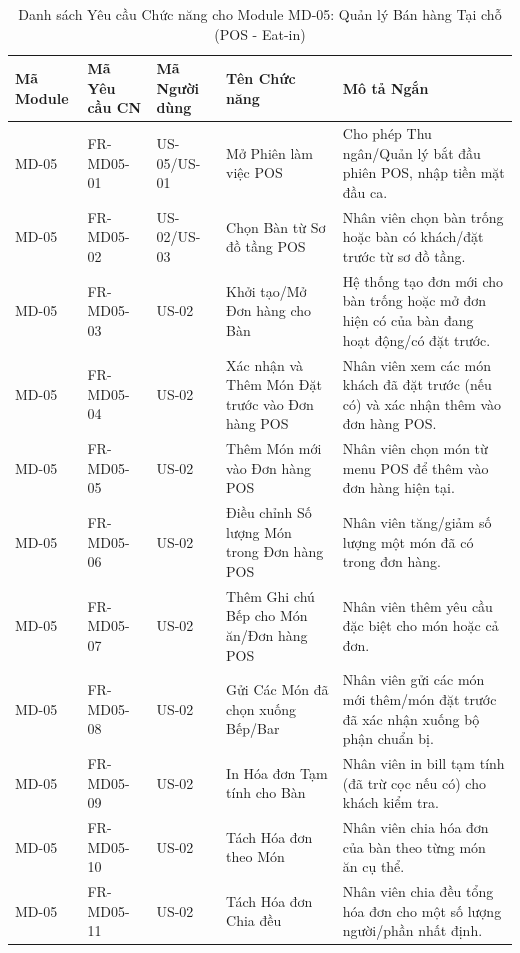\begin{longtable}{|m{2cm}|m{2.5cm}|m{2cm}|m{4.5cm}|m{4cm}|}
\caption{Danh sách Yêu cầu Chức năng cho Module MD-05: Quản lý Bán hàng Tại chỗ (POS - Eat-in)} \label{tab:fr_md05_revised_v3_no_card} \\
\hline
\textbf{Mã Module} & \textbf{Mã Yêu cầu CN} & \textbf{Mã Người dùng} & \textbf{Tên Chức năng} & \textbf{Mô tả Ngắn} \\
\hline
\endhead %
\hline
\endfoot %
\hline
\endlastfoot %

MD-05 & FR-MD05-01 & US-05/US-01 & Mở Phiên làm việc POS & Cho phép Thu ngân/Quản lý bắt đầu phiên POS, nhập tiền mặt đầu ca. \\
\hline
MD-05 & FR-MD05-02 & US-02/US-03 & Chọn Bàn từ Sơ đồ tầng POS & Nhân viên chọn bàn trống hoặc bàn có khách/đặt trước từ sơ đồ tầng. \\
\hline
MD-05 & FR-MD05-03 & US-02 & Khởi tạo/Mở Đơn hàng cho Bàn & Hệ thống tạo đơn mới cho bàn trống hoặc mở đơn hiện có của bàn đang hoạt động/có đặt trước. \\
\hline
MD-05 & FR-MD05-04 & US-02 & Xác nhận và Thêm Món Đặt trước vào Đơn hàng POS & Nhân viên xem các món khách đã đặt trước (nếu có) và xác nhận thêm vào đơn hàng POS. \\
\hline
MD-05 & FR-MD05-05 & US-02 & Thêm Món mới vào Đơn hàng POS & Nhân viên chọn món từ menu POS để thêm vào đơn hàng hiện tại. \\
\hline
MD-05 & FR-MD05-06 & US-02 & Điều chỉnh Số lượng Món trong Đơn hàng POS & Nhân viên tăng/giảm số lượng một món đã có trong đơn hàng. \\
\hline
MD-05 & FR-MD05-07 & US-02 & Thêm Ghi chú Bếp cho Món ăn/Đơn hàng POS & Nhân viên thêm yêu cầu đặc biệt cho món hoặc cả đơn. \\
\hline
MD-05 & FR-MD05-08 & US-02 & Gửi Các Món đã chọn xuống Bếp/Bar & Nhân viên gửi các món mới thêm/món đặt trước đã xác nhận xuống bộ phận chuẩn bị. \\
\hline
MD-05 & FR-MD05-09 & US-02 & In Hóa đơn Tạm tính cho Bàn & Nhân viên in bill tạm tính (đã trừ cọc nếu có) cho khách kiểm tra. \\
\hline
MD-05 & FR-MD05-10 & US-02 & Tách Hóa đơn theo Món & Nhân viên chia hóa đơn của bàn theo từng món ăn cụ thể. \\
\hline
MD-05 & FR-MD05-11 & US-02 & Tách Hóa đơn Chia đều & Nhân viên chia đều tổng hóa đơn cho một số lượng người/phần nhất định. \\

\end{longtable}
